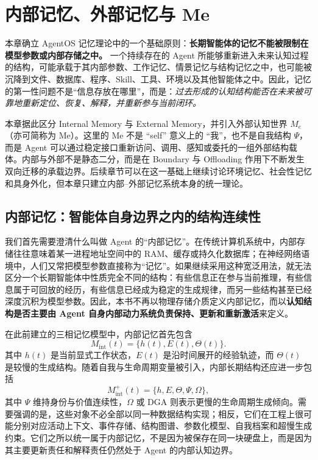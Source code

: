 \chapter{内部记忆、外部记忆与 Me}
\label{chap:internal-external-memory-me}

\begin{chapterlead}
本章确立 AgentOS 记忆理论中的一个基础原则：\textbf{长期智能体的记忆不能被限制在模型参数或内部存储之中。} 一个持续存在的 Agent 所能够重新进入未来认知过程的结构，可能承载于其内部参数、工作记忆、情景记忆与结构记忆之中，也可能被沉降到文件、数据库、程序、Skill、工具、环境以及其他智能体之中。因此，记忆的第一性问题不是“信息存放在哪里”，而是：\emph{过去形成的认知结构能否在未来被可靠地重新定位、恢复、解释，并重新参与当前闭环。}

本章据此区分 Internal Memory 与 External Memory，并引入外部认知世界 \(M_e\)（亦可简称为 Me）。这里的 Me 不是 ``self'' 意义上的 ``我''，也不是自我结构 \(\Psi\)，而是 Agent 可以通过稳定接口重新访问、调用、感知或委托的一组外部结构载体。内部与外部不是静态二分，而是在 Boundary 与 Offloading 作用下不断发生双向迁移的承载边界。后续章节可以在这一基础上继续讨论环境记忆、社会性记忆和具身外化，但本章只建立内部--外部记忆系统本身的统一理论。
\end{chapterlead}

\section{内部记忆：智能体自身边界之内的结构连续性}

我们首先需要澄清什么叫做 Agent 的``内部记忆''。在传统计算机系统中，内部存储往往意味着某一进程地址空间中的 RAM、缓存或持久化数据库；在神经网络语境中，人们又常把模型参数直接称为``记忆''。如果继续采用这种宽泛用法，就无法区分一个长期智能体中性质完全不同的结构：有些信息正在参与当前推理，有些信息属于可回放的经历，有些信息已经成为稳定的生成规律，而另一些结构甚至已经深度沉积为模型参数。因此，本书不再以物理存储介质定义内部记忆，而以\textbf{认知结构是否主要由 Agent 自身内部动力系统负责保持、更新和重新激活}来定义。

在此前建立的三相记忆模型中，内部记忆首先包含
\[
M_{\mathrm{int}}(t)
=
\{h(t),E(t),\Theta(t)\}.
\]
其中 \(h(t)\) 是当前显式工作状态，\(E(t)\) 是沿时间展开的经验轨迹，而 \(\Theta(t)\) 是较慢的生成结构。随着自我与生命周期变量被引入，内部长期结构还应进一步包括
\[
M_{\mathrm{int}}^{+}(t)
=
\{h,E,\Theta,\Psi,\Omega\},
\]
其中 \(\Psi\) 维持身份与价值连续性，\(\Omega\) 或 DGA 则表示更慢的生命周期生成倾向。需要强调的是，这些对象不必全部以同一种数据结构实现；相反，它们在工程上很可能分别对应活动上下文、事件存储、结构图谱、参数化模型、自我档案和超慢生成约束。它们之所以统一属于内部记忆，不是因为被保存在同一块硬盘上，而是因为其主要更新责任和解释责任仍然处于 Agent 的内部认知边界。


